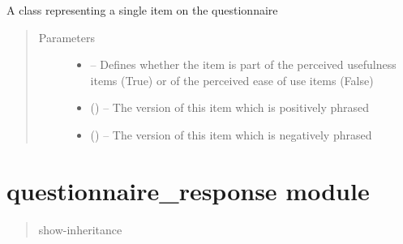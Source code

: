 \documentclass[letterpaper,10pt,english]{sphinxmanual}
\begin{document}
\begin{fulllineitems}
\label{\detokenize{questionnaire_item:questionnaire_item.QuestionnaireItem}}
A class representing a single item on the questionnaire
\begin{quote}\begin{description}
\item[{Parameters}] \leavevmode\begin{itemize}
\item {} 
 -- Defines whether the item is part of the perceived usefulness items (True) or of the perceived ease of use items (False)

\item {} 
 () -- The version of this item which is positively phrased

\item {} 
 () -- The version of this item which is negatively phrased

\end{itemize}

\end{description}\end{quote}

\end{fulllineitems}



\chapter{questionnaire\_response module}
\label{\detokenize{questionnaire_response:questionnaire-response-module}}\label{\detokenize{questionnaire_response::doc}}\label{\detokenize{questionnaire_response:module-questionnaire_response}}\begin{quote}\begin{description}
\item[{show-inheritance}] \leavevmode
\end{description}\end{quote}
\end{document}
